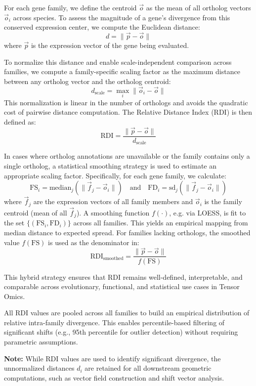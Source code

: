 \documentclass{article}
\begin{document}
For each gene family, we define the centroid \( \vec{o} \) as the mean of all ortholog vectors \( \vec{o}_i \) across species. To assess the magnitude of a gene's divergence from this conserved expression center, we compute the Euclidean distance:
\[
d = \| \vec{p} - \vec{o} \|
\]
where \( \vec{p} \) is the expression vector of the gene being evaluated.

To normalize this distance and enable scale-independent comparison across families, we compute a family-specific scaling factor as the maximum distance between any ortholog vector and the ortholog centroid:
\[
d_{\text{scale}} = \max_i \| \vec{o}_i - \vec{o} \|
\]
This normalization is linear in the number of orthologs and avoids the quadratic cost of pairwise distance computation. The Relative Distance Index (RDI) is then defined as:
\[
\text{RDI} = \frac{\| \vec{p} - \vec{o} \|}{d_{\text{scale}}}
\]

In cases where ortholog annotations are unavailable or the family contains only a single ortholog, a statistical smoothing strategy is used to estimate an appropriate scaling factor. Specifically, for each gene family, we calculate:
\[
\text{FS}_i = \text{median}_j \left( \| \vec{f}_j - \vec{o}_i \| \right)
\quad \text{and} \quad
\text{FD}_i = \text{sd}_j \left( \| \vec{f}_j - \vec{o}_i \| \right)
\]
where \( \vec{f}_j \) are the expression vectors of all family members and \( \vec{o}_i \) is the family centroid (mean of all \( \vec{f}_j \)). A smoothing function \( f(\cdot) \), e.g. via LOESS, is fit to the set \( \{ (\text{FS}_i, \text{FD}_i) \} \) across all families. This yields an empirical mapping from median distance to expected spread. For families lacking orthologs, the smoothed value \( f(\text{FS}) \) is used as the denominator in:
\[
\text{RDI}_{\text{smoothed}} = \frac{\| \vec{p} - \vec{o} \|}{f(\text{FS})}
\]

This hybrid strategy ensures that RDI remains well-defined, interpretable, and comparable across evolutionary, functional, and statistical use cases in Tensor Omics.

All RDI values are pooled across all families to build an empirical distribution of relative intra-family divergence. This enables percentile-based filtering of significant shifts (e.g., 95th percentile for outlier detection) without requiring parametric assumptions.

\textbf{Note:} While RDI values are used to identify significant divergence, the unnormalized distances \( d_i \) are retained for all downstream geometric computations, such as vector field construction and shift vector analysis.
\end{document}
